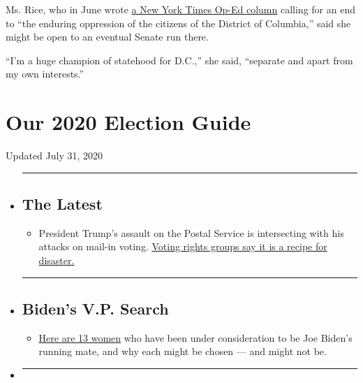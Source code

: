 Ms. Rice, who in June wrote
\href{https://www.nytimes.com/2020/06/09/opinion/trump-military-washington-statehood.html}{a
New York Times Op-Ed column} calling for an end to ``the enduring
oppression of the citizens of the District of Columbia,'' said she might
be open to an eventual Senate run there.

``I'm a huge champion of statehood for D.C.,'' she said, ``separate and
apart from my own interests.''

\hypertarget{our-2020-election-guide}{%
\section{Our 2020 Election Guide}\label{our-2020-election-guide}}

Updated July 31, 2020

\begin{itemize}
\item
  \begin{center}\rule{0.5\linewidth}{\linethickness}\end{center}

  \hypertarget{the-latest}{%
  \subsection{The Latest}\label{the-latest}}

  \begin{itemize}
  \tightlist
  \item
    President Trump's assault on the Postal Service is intersecting with
    his attacks on mail-in voting.
    \href{https://www.nytimes.com/2020/07/31/us/politics/trump-usps-mail-delays.html?action=click\&pgtype=Article\&state=default\&region=BELOW_MAIN_CONTENT\&context=storylines_guide}{Voting
    rights groups say it is a recipe for disaster.}
  \end{itemize}
\item
  \begin{center}\rule{0.5\linewidth}{\linethickness}\end{center}

  \hypertarget{bidens-vp-search}{%
  \subsection{Biden's V.P. Search}\label{bidens-vp-search}}

  \begin{itemize}
  \tightlist
  \item
    \href{https://www.nytimes.com/article/biden-vice-president-2020.html?action=click\&pgtype=Article\&state=default\&region=BELOW_MAIN_CONTENT\&context=storylines_guide}{Here
    are 13 women} who have been under consideration to be Joe Biden's
    running mate, and why each might be chosen --- and might not be.
  \end{itemize}
\item
  \begin{center}\rule{0.5\linewidth}{\linethickness}\end{center}


\end{itemize}
